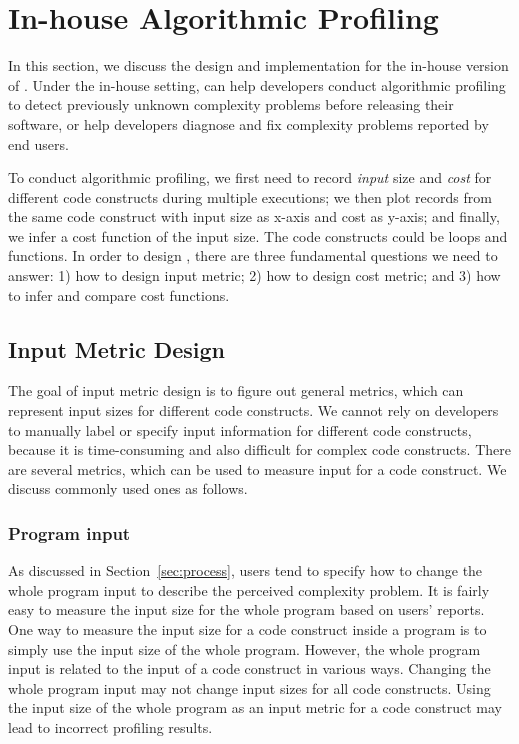 
\newpage
\section{In-house Algorithmic Profiling}
\label{sec:inhouse}

In this section, we discuss the design and implementation for the in-house version of \Tool.
Under the in-house setting, 
\Tool can help developers conduct algorithmic profiling to detect 
previously unknown complexity problems before releasing their software, 
or help developers diagnose and fix complexity problems reported by end users. 

To conduct algorithmic profiling,
we first need to record \textit{input} size and \textit{cost} for different code constructs 
during multiple executions;
we then plot records from the same code construct with input size as x-axis and cost as y-axis; 
and finally, we infer a cost function of the input size.
The code constructs could be loops and functions. 
In order to design \Tool, 
there are three fundamental questions we need to answer:
1) how to design input metric; 2) how to design cost metric; 
and 3) how to infer and compare cost functions.


\subsection{Input Metric Design}
\label{sec:input}

The goal of input metric design is to figure out general metrics, 
which can represent input sizes for different code constructs. 
We cannot rely on developers to manually label or specify input information 
for different code constructs, 
because it is time-consuming and also difficult for complex code constructs.  
There are several metrics, which can be used to measure input for a code construct.
We discuss commonly used ones as follows. 

\subsubsection{Program input}
As discussed in Section~\ref{sec:process}, 
users tend to specify how to change the whole program 
input to describe the perceived complexity problem.
It is fairly easy to measure the input size for the whole program based on users' reports.
One way to measure the input size for a code construct inside a program
is to simply use the input size of the whole program. 
However, the whole program input 
is related to the input of a code construct in various ways.
Changing the whole program input may not change input sizes for 
all code constructs. 
Using the input size of the whole program as an input metric for a code 
construct may lead to incorrect profiling results. 

